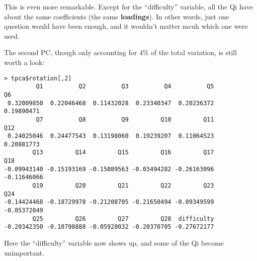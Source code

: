 This is even more remarkable.  Except for the ``difficulty'' variable,
all the Qi have about the same coefficients (the same {\bf loadings}).
In other words, just one question would have been enough, and it
wouldn't matter mcuh which one were used.

The second PC, though only accounting for 4\% of the total variation, is
still worth a look:

\begin{lstlisting}
> tpca$rotation[,2]
         Q1          Q2          Q3          Q4          Q5          Q6 
 0.32009850  0.22046468  0.11432028  0.23340347  0.20236372  0.19890471 
         Q7          Q8          Q9         Q10         Q11         Q12 
 0.24025046  0.24477543  0.13198060  0.19239207  0.11064523  0.20881773 
        Q13         Q14         Q15         Q16         Q17         Q18 
-0.09943140 -0.15193169 -0.15089563 -0.03494282 -0.26163096 -0.11646066 
        Q19         Q20         Q21         Q22         Q23         Q24 
-0.14424468 -0.18729978 -0.21208705 -0.21650494 -0.09349599 -0.05372049 
        Q25         Q26         Q27         Q28  difficulty 
-0.20342350 -0.10790888 -0.05928032 -0.20370705 -0.27672177 
\end{lstlisting}

Here the ``difficulty'' variable now shows up, and some of the Qi become
unimportant.

